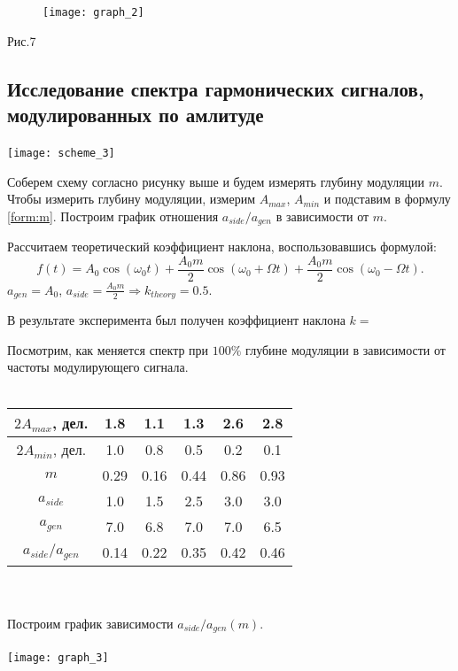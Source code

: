 \documentclass[a4paper,12pt]{article}
\begin{document}
\newpage
\begin{figure}[ht]
\texttt{[image: graph\_2]}
\end{figure} 
\par \hspace{5cm} Рис.7

\subsection{Исследование спектра гармонических сигналов, модулированных по амлитуде}
\texttt{[image: scheme\_3]}
\ \\
\par Соберем схему согласно рисунку выше и будем измерять глубину модуляции $m$. Чтобы измерить глубину модуляции, измерим $A_{max}$, $A_{min}$ и подставим в формулу \ref{form:m}. Построим график отношения $a_{side}/a_{gen}$ в зависимости от $m$.

Рассчитаем теоретический коэффициент наклона, воспользовавшись формулой:
\begin{equation}
\label{form:a/a(m)}
	f(t)=A_0\cos(\omega_0t)+	\frac{A_0m}{2}\cos(\omega_0+\Omega t)+\frac{A_0m}{2}\cos(\omega_0-\Omega t). 
\end{equation}
\newpage
$a_{gen} = A_0$, $a_{side}= \frac{A_0m}{2} \Rightarrow k_{theory}=0.5$.

В результате эксперимента был получен коэффициент наклона $k=$

Посмотрим, как меняется спектр при $100\%$ глубине модуляции в зависимости от частоты модулирующего сигнала.
\ \\
\ \\

\begin{tabular}{|c|c|c|c|c|c|}
	\hline
	$2A_{max}$, дел. & 1.8 & 1.1 & 1.3 & 2.6 & 2.8 \\
	\hline
	$2A_{min}$, дел. & 1.0 & 0.8 & 0.5 & 0.2 & 0.1  \\
	\hline
	$m$ & 0.29 & 0.16 & 0.44 & 0.86 & 0.93 \\
	\hline
	$a_{side}$ & 1.0 & 1.5 & 2.5 & 3.0 & 3.0 \\
	\hline
	$a_{gen}$ & 7.0 & 6.8 & 7.0 & 7.0 & 6.5 \\
	\hline
	$a_{side}/a_{gen}$ & 0.14 & 0.22 & 0.35 & 0.42 & 0.46 \\
	\hline
\end{tabular}

\ \\
\ \\
Построим график зависимости $a_{side}/a_{gen}(m)$.
\ \\
\ \\
\texttt{[image: graph\_3]}
\end{document}
